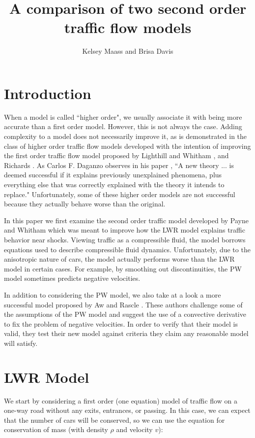 \documentclass{article}
\title{A comparison of two second order traffic flow models}
\author{Kelsey Maass and Brisa Davis}
\begin{document}
\maketitle

\section{Introduction}
When a model is called ``higher order", we usually associate it with being more accurate than a first order model.  However, this is not always the case.  Adding complexity to a model does not necessarily improve it, as is demonstrated in the class of higher order traffic flow models developed with the intention of improving the first order traffic flow model proposed by Lighthill and Whitham \cite{Lighthill1955}, and Richards \cite{Richards1956}.  As Carlos F. Daganzo observes in his paper \cite{Daganzo1995}, ``A new theory ... is deemed successful if it explains previously unexplained phenomena, plus everything else that was correctly explained with the theory it intends to replace."  Unfortunately, some of these higher order models are not successful because they actually behave worse than the original.  

In this paper we first examine the second order traffic model developed by Payne \cite{Payne1971} and Whitham \cite{Whitham1974} which was meant to improve how the LWR model explains traffic behavior near shocks.  Viewing traffic as a compressible fluid, the model borrows equations used to describe compressible fluid dynamics.  Unfortunately, due to the anisotropic nature of cars, the model actually performs worse than the LWR model in certain cases.  For example, by smoothing out discontinuities, the PW model sometimes predicts negative velocities.  

In addition to considering the PW model, we also take at a look a more successful model proposed by Aw and Rascle \cite{AwRascle2000}.  These authors challenge some of the assumptions of the PW model and suggest the use of a convective derivative to fix the problem of negative velocities.  In order to verify that their model is valid, they test their new model against criteria they claim any reasonable model will satisfy.  

\section{LWR Model}
We start by considering a first order (one equation) model of traffic flow on a one-way road without any exits, entrances, or passing.  In this case, we can expect that the number of cars will be conserved, so we can use the equation for conservation of mass (with density $\rho$ and velocity $v$):
\end{document}
